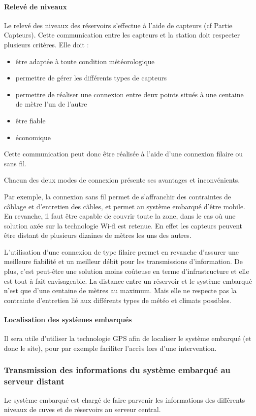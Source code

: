 \documentclass{mise_en_page}
\begin{document}
\paragraph{Relevé de niveaux}
Le relevé des niveaux des réservoirs s’effectue à l’aide de capteurs (cf
Partie Capteurs). Cette communication entre les capteurs et la station
doit respecter plusieurs critères. Elle doit : 

\begin{itemize}
\item être adaptée à toute condition météorologique
\item permettre de gérer les différents types de capteurs
\item permettre de réaliser une connexion entre deux points situés à une
centaine de mètre l’un de l’autre
\item être fiable
\item économique
\end{itemize}
Cette communication peut donc être réalisée à l’aide d’une connexion
filaire ou sans fil.

Chacun des deux modes de connexion présente ses avantages et
inconvénients. 

Par exemple, la connexion sans fil permet de s’affranchir des
contraintes de câblage et d'entretien des câbles, et
permet au système embarqué d’être mobile. En revanche, il faut être
capable de couvrir toute la zone, dans le cas où une solution axée sur
la technologie Wi-fi est retenue. En effet les capteurs peuvent être
distant de plusieurs dizaines de mètres les uns des autres.

L’utilisation d’une connexion de type filaire permet en revanche
d’assurer une meilleure fiabilité et un meilleur débit pour les
transmissions d’information. De plus, c’est peut-être une solution
moins coûteuse en terme d’infrastructure et elle est tout à fait
envisageable. La distance entre un réservoir et le système embarqué
n’est que d’une centaine de mètres au maximum. Mais elle ne respecte
pas la contrainte d’entretien lié aux différents types de météo et
climats possibles.

\paragraph{Localisation des systèmes embarqués}
Il sera utile d’utiliser la technologie GPS afin de localiser le système
embarqué (et donc le site), pour par exemple faciliter l’accès lors
d’une intervention. 

\subsubsection{Transmission des informations du système embarqué au serveur
distant}
Le système embarqué est chargé de faire parvenir les informations des
différents niveaux de cuves et de réservoirs au serveur central. 
\end{document}
